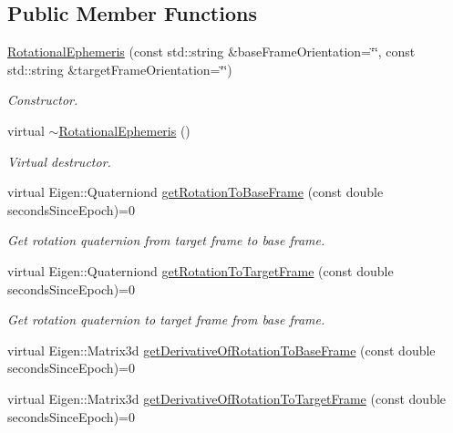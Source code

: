 \subsection*{Public Member Functions}
\begin{DoxyCompactItemize}
\item 
\hyperlink{classtudat_1_1ephemerides_1_1RotationalEphemeris_a224420ee5a24d5ffe7d64b64f81d11f3}{Rotational\+Ephemeris} (const std\+::string \&base\+Frame\+Orientation=\char`\"{}\char`\"{}, const std\+::string \&target\+Frame\+Orientation=\char`\"{}\char`\"{})
\begin{DoxyCompactList}\small\item\em Constructor. \end{DoxyCompactList}\item 
virtual \hyperlink{classtudat_1_1ephemerides_1_1RotationalEphemeris_a4964ece0cf96c422462568cbd0560eda}{$\sim$\+Rotational\+Ephemeris} ()
\begin{DoxyCompactList}\small\item\em Virtual destructor. \end{DoxyCompactList}\item 
virtual Eigen\+::\+Quaterniond \hyperlink{classtudat_1_1ephemerides_1_1RotationalEphemeris_a48c05e29f3a225433eb02feb09d1b77a}{get\+Rotation\+To\+Base\+Frame} (const double seconds\+Since\+Epoch)=0
\begin{DoxyCompactList}\small\item\em Get rotation quaternion from target frame to base frame. \end{DoxyCompactList}\item 
virtual Eigen\+::\+Quaterniond \hyperlink{classtudat_1_1ephemerides_1_1RotationalEphemeris_a569eeb2b7416693589b6f2b4707932a7}{get\+Rotation\+To\+Target\+Frame} (const double seconds\+Since\+Epoch)=0
\begin{DoxyCompactList}\small\item\em Get rotation quaternion to target frame from base frame. \end{DoxyCompactList}\item 
virtual Eigen\+::\+Matrix3d \hyperlink{classtudat_1_1ephemerides_1_1RotationalEphemeris_ae3d4f6abdc820c309328747397b25afc}{get\+Derivative\+Of\+Rotation\+To\+Base\+Frame} (const double seconds\+Since\+Epoch)=0
\item 
virtual Eigen\+::\+Matrix3d \hyperlink{classtudat_1_1ephemerides_1_1RotationalEphemeris_a8749ef7c763d598973acf970c546c601}{get\+Derivative\+Of\+Rotation\+To\+Target\+Frame} (const double seconds\+Since\+Epoch)=0

\end{DoxyCompactItemize}
